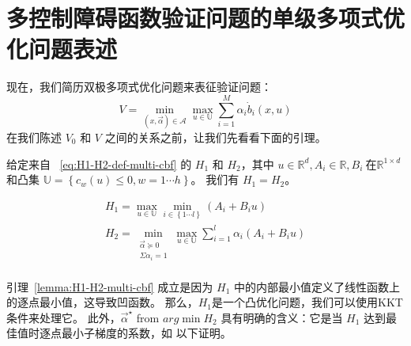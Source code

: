 \section{多控制障碍函数验证问题的单级多项式优化问题表述}
\label{sec:single-POP-multi-cbf}
现在，我们简历双极多项式优化问题来表征验证问题：
\begin{equation}    \label{eq:V-multi-cbf}
V=\min_{\left( x,\overrightarrow{\alpha } \right) \in \mathcal{A}}\max_{u\in \mathbb{U}} \sum_{i=1}^M{\alpha _i\dot{b}_i\left( x,u \right)}
\end{equation}
在我们陈述 $V_0$ 和 $V$ 之间的关系之前，让我们先看看下面的引理。

\begin{lemma} \label{lemma:H1-H2-multi-cbf}
    给定来自 ~\eqref{eq:H1-H2-def-multi-cbf} 的 $H_1$ 和 $H_2$，其中 $u\in \mathbb{R} ^d,A_i\in \mathbb{R} ,B_i\ 在 \mathbb{R} ^{1\times d}$ 和凸集 $\mathbb{U} =\left\{ c_w\left( u \right) \le 0,w=1\cdots h \right\} $。 我们有 $H_1 = H_2$。
\end{lemma}

\begin{eqnarray} \label{eq:H1-H2-def-multi-cbf}
	H_1=\max_{u\in \mathbb{U}}\min_{i\in \left\{ 1\cdots l \right\}}\left( A_i+B_iu \right)\\
	H_2=\min_{\begin{array}{c}
	\overrightarrow{\alpha }\succeq 0\\
	\Sigma \alpha _i=1\\
\end{array}}\max_{u\in \mathbb{U}}\sum_{i=1}^l{\alpha _i\left( A_i+B_iu \right)}
\end{eqnarray}

\begin{remark}
    引理~\ref{lemma:H1-H2-multi-cbf} 成立是因为 $H_1$ 中的内部最小值定义了线性函数上的逐点最小值，这导致凹函数。 那么，$H_1$是一个凸优化问题，我们可以使用KKT条件来处理它。 此外，$\overrightarrow{\alpha}^{\star}$ from $arg \min H_2$ 具有明确的含义：它是当 $H_1$ 达到最佳值时逐点最小子梯度的系数，如 以下证明。
\end{remark}

